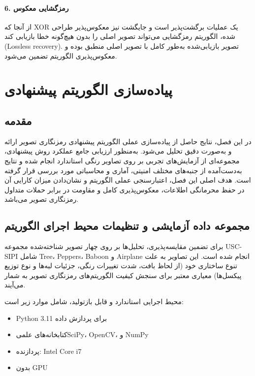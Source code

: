 \documentclass[a4paper,12pt]{report}
\renewcommand{\%}{\lr{\oldpercent}}
\providecommand{\lr}[1]{#1}
\begin{document}
\subsubsection{6. رمزگشایی معکوس}
از آنجا که \lr{XOR} یک عملیات برگشت‌پذیر است و جایگشت نیز معکوس‌پذیر طراحی شده، الگوریتم رمزگشایی می‌تواند تصویر اصلی را بدون هیچ‌گونه خطا بازیابی کند (\lr{Lossless recovery}). تصویر بازیابی‌شده به‌طور کامل با تصویر اصلی منطبق بوده و معکوس‌پذیری الگوریتم تضمین می‌شود.

\newpage

\chapter{پیاده‌سازی الگوریتم پیشنهادی}

\section{مقدمه}
در این فصل، نتایج حاصل از پیاده‌سازی عملی الگوریتم پیشنهادی رمزنگاری تصویر ارائه و به‌صورت دقیق تحلیل می‌شود. به‌منظور ارزیابی جامع عملکرد روش پیشنهادی، مجموعه‌ای از آزمایش‌های تجربی بر روی تصاویر رنگی استاندارد انجام شده و نتایج به‌دست‌آمده از جنبه‌های مختلف امنیتی، آماری و محاسباتی مورد بررسی قرار گرفته است. هدف اصلی این فصل، اعتبارسنجی عملی الگوریتم و نشان‌دادن میزان کارایی آن در حفظ محرمانگی اطلاعات، معکوس‌پذیری کامل و مقاومت در برابر حملات متداول رمزنگاری تصویر می‌باشد.

\section{مجموعه داده آزمایشی و تنظیمات محیط اجرای الگوریتم}
برای تضمین مقایسه‌پذیری، تحلیل‌ها بر روی چهار تصویر شناخته‌شده مجموعه \lr{USC-SIPI} شامل \lr{Tree}، \lr{Peppers}، \lr{Baboon} و \lr{Airplane} انجام شده است. این تصاویر به علت تنوع ساختاری خود (از لحاظ بافت، شدت تغییرات رنگی، جزئیات لبه‌ها و نوع توزیع پیکسل‌ها) معیاری معتبر برای سنجش کیفیت الگوریتم‌های رمزنگاری تصویر به شمار می‌آیند.


محیط اجرایی استاندارد و قابل بازتولید، شامل موارد زیر است:
\begin{itemize}
    \item \lr{Python 3.11} برای پردازش داده
    \item کتابخانه‌های علمی‌\lr{SciPy}، \lr{OpenCV}، و \lr{NumPy}
    \item پردازنده: \lr{Intel Core i7}
    \item بدون \lr{GPU}
\end{itemize}
\end{document}
